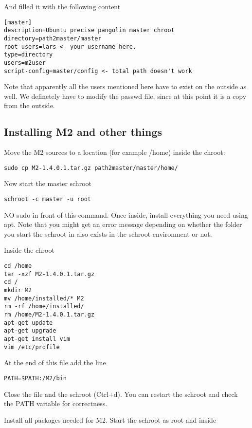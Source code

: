 \documentclass[a4paper]{book}
\begin{document}
And filled it with the following content

\begin{verbatim}
[master]
description=Ubuntu precise pangolin master chroot
directory=path2master/master
root-users=lars <- your username here.
type=directory
users=m2user
script-config=master/config <- total path doesn't work
\end{verbatim}

Note that apparently all the users mentioned here have to exist on the outside
as well.  We definetely have to modify the passwd file, since at this point it
is a copy from the outside.

\subsection{Installing M2 and other things}

Move the M2 sources to a location (for example /home) inside the chroot:

\begin{verbatim}
sudo cp M2-1.4.0.1.tar.gz path2master/master/home/
\end{verbatim}

Now start the master schroot

\begin{verbatim}
schroot -c master -u root
\end{verbatim}

NO sudo in front of this command. Once inside, install everything you need
using apt.  Note that you might get an error message depending on whether the
folder you start the schroot in also exists in the schroot environment or not.

Inside the chroot

\begin{verbatim}
cd /home
tar -xzf M2-1.4.0.1.tar.gz
cd /
mkdir M2
mv /home/installed/* M2
rm -rf /home/installed/
rm /home/M2-1.4.0.1.tar.gz
apt-get update
apt-get upgrade
apt-get install vim
vim /etc/profile
\end{verbatim}

At the end of this file add the line

\begin{verbatim}
PATH=$PATH:/M2/bin
\end{verbatim}

Close the file and the schroot (Ctrl+d). You can restart the schroot and check
the PATH variable for correctness.

Install all packages needed for M2. Start the schroot as root and inside
\end{document}
